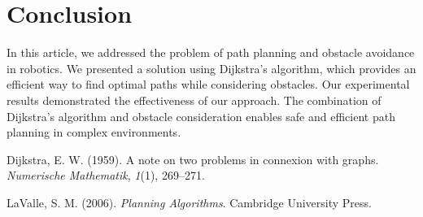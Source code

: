 \documentclass{article}
\begin{document}
\section{Conclusion}
In this article, we addressed the problem of path planning and obstacle avoidance in robotics. We presented a solution using Dijkstra's algorithm, which provides an efficient way to find optimal paths while considering obstacles. Our experimental results demonstrated the effectiveness of our approach. The combination of Dijkstra's algorithm and obstacle consideration enables safe and efficient path planning in complex environments.


\begin{thebibliography}{9}
Dijkstra, E. W. (1959). A note on two problems in connexion with graphs. \textit{Numerische Mathematik}, \textit{1}(1), 269--271.

LaValle, S. M. (2006). \textit{Planning Algorithms}. Cambridge University Press.
\end{thebibliography}
\end{document}
